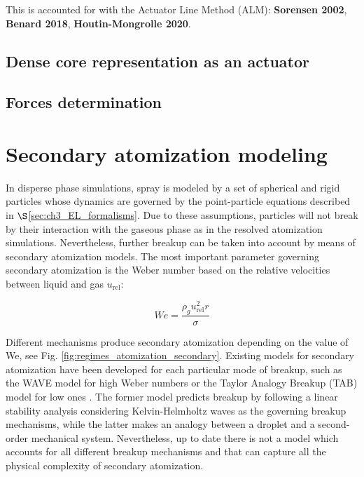  This is accounted for with the Actuator Line Method (ALM): \textbf{Sorensen 2002}, \textbf{Benard 2018}, \textbf{Houtin-Mongrolle 2020}.

\subsection{Dense core representation as an actuator}



\subsection{Forces determination}



\section{Secondary atomization modeling}
\label{sec:ch4_secondary_atomization_modeling}

In disperse phase simulations, spray is modeled by a set of spherical and rigid particles whose dynamics are governed by the point-particle equations described in $\S$\ref{sec:ch3_EL_formalisms}. Due to these assumptions, particles will not break by their interaction with the gaseous phase as in the resolved atomization simulations. Nevertheless, further breakup can be taken into account by means of secondary atomization models. The most important parameter governing secondary atomization is the Weber number based on the relative velocities between liquid and gas $u_\mathrm{rel}$:

\begin{equation}
\label{eq:We_secondary_atomization_definition}
We = \frac{\rho_g u_\mathrm{rel}^2 r}{\sigma} 
\end{equation}

Different mechanisms produce secondary atomization depending on the value of We, see Fig. \ref{fig:regimes_atomization_secondary}. Existing models for secondary atomization have been developed for each particular mode of breakup, such as the WAVE model for high Weber numbers  or the Taylor Analogy Breakup (TAB) model for low ones . The former model predicts breakup by following a linear stability analysis considering Kelvin-Helmholtz waves as the governing breakup mechanisms, while the latter makes an analogy between a droplet and a second-order mechanical system. Nevertheless, up to date there is not a model which accounts for all different breakup mechanisms and that can capture all the physical complexity of secondary atomization.

